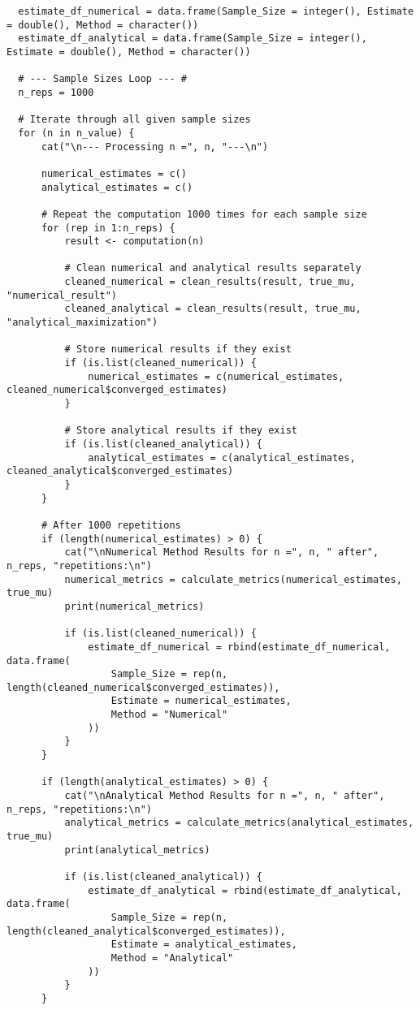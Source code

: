 \documentclass{report}
\begin{document}
\begin{verbatim}
  estimate_df_numerical = data.frame(Sample_Size = integer(), Estimate = double(), Method = character())
  estimate_df_analytical = data.frame(Sample_Size = integer(), Estimate = double(), Method = character())
  
  # --- Sample Sizes Loop --- #
  n_reps = 1000
  
  # Iterate through all given sample sizes
  for (n in n_value) {
      cat("\n--- Processing n =", n, "---\n")
  
      numerical_estimates = c()
      analytical_estimates = c()
  
      # Repeat the computation 1000 times for each sample size
      for (rep in 1:n_reps) {
          result <- computation(n)
        
          # Clean numerical and analytical results separately
          cleaned_numerical = clean_results(result, true_mu, "numerical_result")
          cleaned_analytical = clean_results(result, true_mu, "analytical_maximization")
  
          # Store numerical results if they exist
          if (is.list(cleaned_numerical)) {
              numerical_estimates = c(numerical_estimates, cleaned_numerical$converged_estimates)
          }
  
          # Store analytical results if they exist
          if (is.list(cleaned_analytical)) {
              analytical_estimates = c(analytical_estimates, cleaned_analytical$converged_estimates)
          }
      }
  
      # After 1000 repetitions
      if (length(numerical_estimates) > 0) {
          cat("\nNumerical Method Results for n =", n, " after", n_reps, "repetitions:\n")
          numerical_metrics = calculate_metrics(numerical_estimates, true_mu)
          print(numerical_metrics)
  
          if (is.list(cleaned_numerical)) {
              estimate_df_numerical = rbind(estimate_df_numerical, data.frame(
                  Sample_Size = rep(n, length(cleaned_numerical$converged_estimates)),
                  Estimate = numerical_estimates,
                  Method = "Numerical"
              ))
          }
      }
  
      if (length(analytical_estimates) > 0) {
          cat("\nAnalytical Method Results for n =", n, " after", n_reps, "repetitions:\n")
          analytical_metrics = calculate_metrics(analytical_estimates, true_mu)
          print(analytical_metrics)
  
          if (is.list(cleaned_analytical)) {
              estimate_df_analytical = rbind(estimate_df_analytical, data.frame(
                  Sample_Size = rep(n, length(cleaned_analytical$converged_estimates)),
                  Estimate = analytical_estimates,
                  Method = "Analytical"
              ))
          }
      }
  

\end{verbatim}
\end{document}
